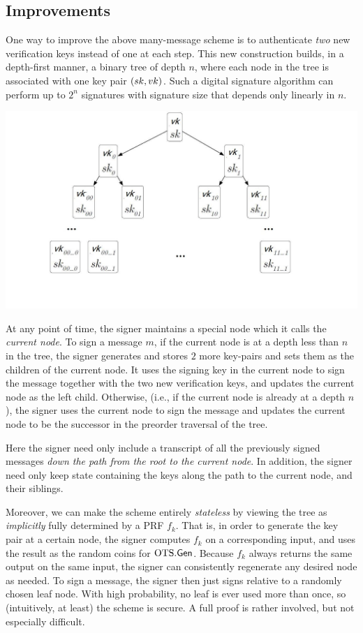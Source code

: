 \documentclass[11pt]{article}
\begin{document}
\subsection{Improvements}
\label{sec:improvements}

One way to improve the above many-message scheme is to authenticate
\emph{two} new verification keys instead of one at each step.  This
new construction builds, in a depth-first manner, a binary tree of
depth $n$, where each node in the tree is associated with one key pair
$(sk,vk)$.  Such a digital signature algorithm can perform up to
$2^n$ signatures with signature size that depends only linearly in
$n$.

\begin{center}
\includegraphics[scale = 0.35]{tree}
\end{center}

At any point of time, the signer maintains a special node which it
calls the \emph{current node}.  To sign a message $m$, if the current
node is at a depth less than $n$ in the tree, the signer generates and
stores $2$ more key-pairs and sets them as the children of the current
node.  It uses the signing key in the current node to sign the message
together with the two new verification keys, and updates the current
node as the left child.  Otherwise, (i.e., if the current node is
already at a depth $n$), the signer uses the current node to sign the
message and updates the current node to be the successor in the
preorder traversal of the tree.

Here the signer need only include a transcript of all the previously
signed messages \emph{down the path from the root to the current
  node}.  In addition, the signer need only keep state containing the
keys along the path to the current node, and their siblings.

Moreover, we can make the scheme entirely \emph{stateless} by viewing
the tree as \emph{implicitly} fully determined by a PRF $f_{k}$.  That
is, in order to generate the key pair at a certain node, the signer
computes $f_{k}$ on a corresponding input, and uses the result as the
random coins for $\text{OTS}.\mathsf{Gen}$.  Because $f_{k}$ always returns the
same output on the same input, the signer can consistently regenerate
any desired node as needed.  To sign a message, the signer then just
signs relative to a randomly chosen leaf node.  With high probability,
no leaf is ever used more than once, so (intuitively, at least) the
scheme is secure.  A full proof is rather involved, but not especially
difficult.
\end{document}
